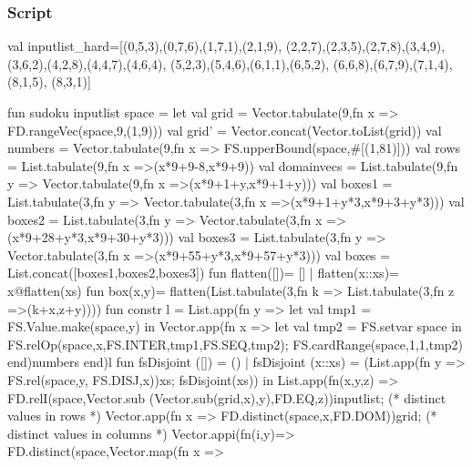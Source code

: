 \documentclass[a4paper]{scrartcl}
\begin{document}
\subsubsection{Script}
\begin{myverbatim}
val inputlist_hard=[(0,5,3),(0,7,6),(1,7,1),(2,1,9),
                    (2,2,7),(2,3,5),(2,7,8),(3,4,9),
                    (3,6,2),(4,2,8),(4,4,7),(4,6,4),
                    (5,2,3),(5,4,6),(6,1,1),(6,5,2),
                    (6,6,8),(6,7,9),(7,1,4),(8,1,5),
                    (8,3,1)]                 

fun sudoku inputlist space = 
  let
     val grid = Vector.tabulate(9,fn x => 
                         FD.rangeVec(space,9,(1,9)))
     val grid' = Vector.concat(Vector.toList(grid))
     val numbers = Vector.tabulate(9,fn x => 
                         FS.upperBound(space,#[(1,81)]))
     val rows = List.tabulate(9,fn x =>(x*9+9-8,x*9+9)) 
     val domainvecs = List.tabulate(9,fn y => 
                       Vector.tabulate(9,fn x =>(x*9+1+y,x*9+1+y)))
     val boxes1 = List.tabulate(3,fn y => 
                   Vector.tabulate(3,fn x =>(x*9+1+y*3,x*9+3+y*3)))
     val boxes2 = List.tabulate(3,fn y => 
                   Vector.tabulate(3,fn x =>(x*9+28+y*3,x*9+30+y*3)))
     val boxes3 = List.tabulate(3,fn y => 
                   Vector.tabulate(3,fn x =>(x*9+55+y*3,x*9+57+y*3)))
     val boxes = List.concat([boxes1,boxes2,boxes3])
     fun flatten([])= []
       | flatten(x::xs)= x@flatten(xs)
     fun box(x,y)= flatten(List.tabulate(3,fn k => 
                            List.tabulate(3,fn z =>(k+x,z+y))))
     fun constr l = 
       List.app(fn y => 
           let
              val tmp1 = FS.Value.make(space,y)
           in
              Vector.app(fn x => 
                  let 
                     val tmp2 = FS.setvar space 
                  in
                     FS.relOp(space,x,FS.INTER,tmp1,FS.SEQ,tmp2);
                     FS.cardRange(space,1,1,tmp2)
                  end)numbers
           end)l 
     fun fsDisjoint ([]) = ()
       | fsDisjoint (x::xs) = 
            (List.app(fn y => FS.rel(space,y, FS.DISJ,x))xs;
             fsDisjoint(xs))           
  in
     List.app(fn(x,y,z) => FD.relI(space,Vector.sub
                          (Vector.sub(grid,x),y),FD.EQ,z))inputlist;
    (* distinct values in rows *)
     Vector.app(fn x => FD.distinct(space,x,FD.DOM))grid;
    (* distinct values in columns *)
     Vector.appi(fn(i,y)=> FD.distinct(space,Vector.map(fn x => 

\end{myverbatim}
\end{document}
